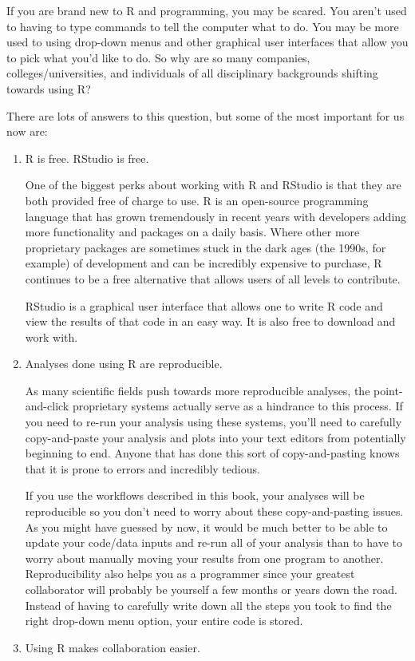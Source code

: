 \documentclass[]{tufte-book}
\begin{document}
If you are brand new to R and programming, you may be scared. You aren't
used to having to type commands to tell the computer what to do. You may
be more used to using drop-down menus and other graphical user
interfaces that allow you to pick what you'd like to do. So why are so
many companies, colleges/universities, and individuals of all
disciplinary backgrounds shifting towards using R?

There are lots of answers to this question, but some of the most
important for us now are:

\begin{enumerate}
\def\labelenumi{\arabic{enumi}.}
\item
  R is free. RStudio is free.

  One of the biggest perks about working with R and RStudio is that they
  are both provided free of charge to use. R is an open-source
  programming language that has grown tremendously in recent years with
  developers adding more functionality and packages on a daily basis.
  Where other more proprietary packages are sometimes stuck in the dark
  ages (the 1990s, for example) of development and can be incredibly
  expensive to purchase, R continues to be a free alternative that
  allows users of all levels to contribute.

  RStudio is a graphical user interface that allows one to write R code
  and view the results of that code in an easy way. It is also free to
  download and work with.
\item
  Analyses done using R are reproducible.

  As many scientific fields push towards more reproducible analyses, the
  point-and-click proprietary systems actually serve as a hindrance to
  this process. If you need to re-run your analysis using these systems,
  you'll need to carefully copy-and-paste your analysis and plots into
  your text editors from potentially beginning to end. Anyone that has
  done this sort of copy-and-pasting knows that it is prone to errors
  and incredibly tedious.

  If you use the workflows described in this book, your analyses will be
  reproducible so you don't need to worry about these copy-and-pasting
  issues. As you might have guessed by now, it would be much better to
  be able to update your code/data inputs and re-run all of your
  analysis than to have to worry about manually moving your results from
  one program to another. Reproducibility also helps you as a programmer
  since your greatest collaborator will probably be yourself a few
  months or years down the road. Instead of having to carefully write
  down all the steps you took to find the right drop-down menu option,
  your entire code is stored.
\item
  Using R makes collaboration easier.


\end{enumerate}
\end{document}
